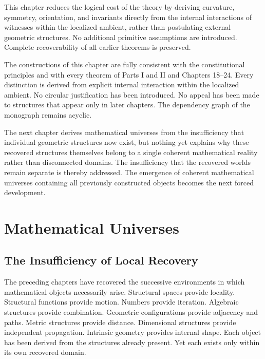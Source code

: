 \documentclass[12pt,anyside]{book}
\begin{document}
\begin{reductionaudit}
This chapter reduces the logical cost of the theory by deriving curvature, symmetry, orientation, and invariants directly from the internal interactions of witnesses within the localized ambient, rather than postulating external geometric structures. No additional primitive assumptions are introduced. Complete recoverability of all earlier theorems is preserved.
\end{reductionaudit}

\begin{consistencyaudit}
The constructions of this chapter are fully consistent with the constitutional principles and with every theorem of Parts I and II and Chapters 18--24. Every distinction is derived from explicit internal interaction within the localized ambient. No circular justification has been introduced. No appeal has been made to structures that appear only in later chapters. The dependency graph of the monograph remains acyclic.
\end{consistencyaudit}

\begin{futurework}
The next chapter derives mathematical universes from the insufficiency that individual geometric structures now exist, but nothing yet explains why these recovered structures themselves belong to a single coherent mathematical reality rather than disconnected domains. The insufficiency that the recovered worlds remain separate is thereby addressed. The emergence of coherent mathematical universes containing all previously constructed objects becomes the next forced development.
\end{futurework}

\chapter{Mathematical Universes}

\section{The Insufficiency of Local Recovery}
The preceding chapters have recovered the successive environments in which mathematical objects necessarily arise. Structural spaces provide locality. Structural functions provide motion. Numbers provide iteration. Algebraic structures provide combination. Geometric configurations provide adjacency and paths. Metric structures provide distance. Dimensional structures provide independent propagation. Intrinsic geometry provides internal shape. Each object has been derived from the structures already present. Yet each exists only within its own recovered domain.
\end{document}
